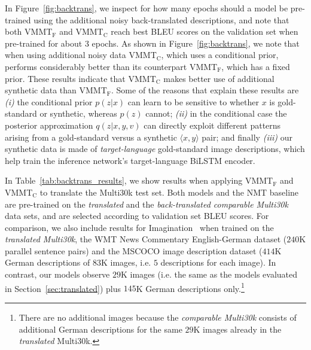 \documentclass[11pt,a4paper]{article}
\newcommand{\cond}{VMMT$_{\text{C}}$\xspace}
\newcommand{\uncond}{VMMT$_{\text{F}}$\xspace}
\begin{document}
In Figure~\ref{fig:backtrans}, we inspect for how many epochs should a model be pre-trained using the additional noisy back-translated descriptions, and
note that both \uncond and \cond reach best BLEU scores on the validation set when pre-trained for about 3 epochs.
As shown in Figure~\ref{fig:backtrans}, we note that when using additional noisy data \cond, which uses a conditional prior, performs considerably better than its counterpart \uncond, which has a fixed prior.
These results indicate that \cond makes better use of additional synthetic data than \uncond.
Some of the reasons that explain these results are
\textit{(i)} the conditional prior $p(z|x)$ can learn to be sensitive to whether $x$ is gold-standard or synthetic, whereas $p(z)$ cannot;
\textit{(ii)} in the conditional case the posterior approximation $q(z|x,y,v)$ can directly exploit different patterns arising from a gold-standard versus a synthetic $\langle x,y \rangle$ pair; and finally
\textit{(iii)} our synthetic data is made of \emph{target-language} gold-standard image descriptions, which help train the inference network's target-language BiLSTM encoder.


In Table~\ref{tab:backtrans_results}, we show results when applying \uncond and \cond to translate the Multi30k test set. Both models and the NMT baseline are pre-trained on the \emph{translated} and the \emph{back-translated comparable Multi30k} data sets, and are selected according to validation set BLEU scores.
For comparison, we also include results for Imagination~\citep{ElliottKadar2017} when trained on the \emph{translated Multi30k}, the WMT News Commentary English-German dataset ($240$K parallel sentence pairs) and the MSCOCO image description dataset ($414$K German descriptions of $83$K images, i.e. $5$ descriptions for each image).
In contrast, our models observe $29$K images (i.e. the same as the models evaluated in Section~\ref{sec:translated}) plus $145$K German descriptions only.\footnote{There are no additional images because the \emph{comparable Multi30k} consists of additional German descriptions for the same $29$K images already in the \emph{translated} Multi30k.}
\end{document}
